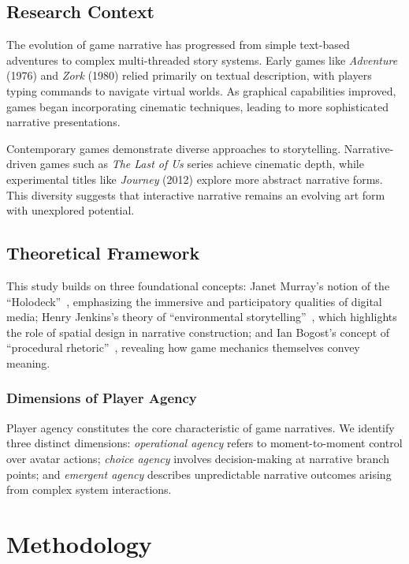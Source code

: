 \documentclass[red,fullpaper]{ludusofficial}  %
\begin{document}
\subsection{Research Context}

The evolution of game narrative has progressed from simple text-based adventures to complex multi-threaded story systems. Early games like \textit{Adventure} (1976) and \textit{Zork} (1980) relied primarily on textual description, with players typing commands to navigate virtual worlds. As graphical capabilities improved, games began incorporating cinematic techniques, leading to more sophisticated narrative presentations.

Contemporary games demonstrate diverse approaches to storytelling. Narrative-driven games such as \textit{The Last of Us} series achieve cinematic depth, while experimental titles like \textit{Journey} (2012) explore more abstract narrative forms. This diversity suggests that interactive narrative remains an evolving art form with unexplored potential.

\subsection{Theoretical Framework}

This study builds on three foundational concepts: Janet Murray's notion of the ``Holodeck''~\cite{murray1997}, emphasizing the immersive and participatory qualities of digital media; Henry Jenkins's theory of ``environmental storytelling''~\cite{jenkins2004}, which highlights the role of spatial design in narrative construction; and Ian Bogost's concept of ``procedural rhetoric''~\cite{bogost2007}, revealing how game mechanics themselves convey meaning.

\subsubsection{Dimensions of Player Agency}

Player agency constitutes the core characteristic of game narratives. We identify three distinct dimensions: \textit{operational agency} refers to moment-to-moment control over avatar actions; \textit{choice agency} involves decision-making at narrative branch points; and \textit{emergent agency} describes unpredictable narrative outcomes arising from complex system interactions.

\section{Methodology}
\end{document}
